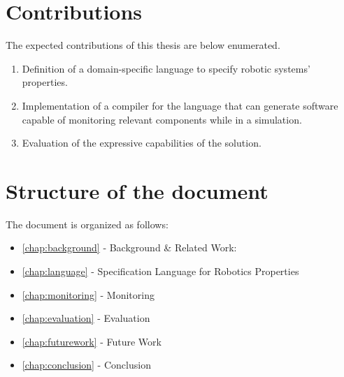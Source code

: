 \section{Contributions}
\label{sec:contributions}

The expected contributions of this thesis are below enumerated.

\begin{enumerate}
    \item Definition of a domain-specific language to specify robotic systems' properties.
    \item Implementation of a compiler for the language that can generate software capable of monitoring relevant components while in a simulation.
    \item Evaluation of the expressive capabilities of the solution.
\end{enumerate}


\section{Structure of the document}
\label{sec:structure}

The document is organized as follows:

\begin{itemize}
    \item \autoref{chap:background} - Background \& Related Work:
    \item \autoref{chap:language} - Specification Language for Robotics Properties
    \item \autoref{chap:monitoring} - Monitoring
    \item \autoref{chap:evaluation} - Evaluation 
    \item \autoref{chap:futurework} - Future Work
    \item \autoref{chap:conclusion} - Conclusion
\end{itemize}
